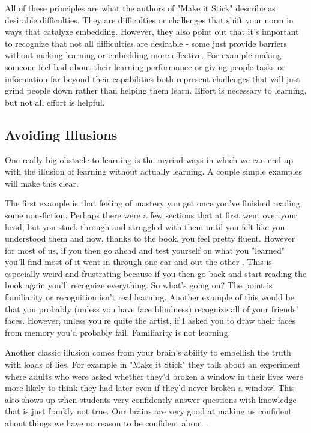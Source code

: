 \documentclass[11pt,a5paper]{book}
\begin{document}
All of these principles are what the authors of "Make it Stick" \cite{stick} describe as desirable difficulties. They are difficulties or challenges that shift your norm in ways that catalyze embedding. However, they also point out that it's important to recognize that not all difficulties are desirable - some just provide barriers without making learning or embedding more effective. For example making someone feel bad about their learning performance or giving people tasks or information far beyond their capabilities both represent challenges that will just grind people down rather than helping them learn. Effort is necessary to learning, but not all effort is helpful.

\subsection{Avoiding Illusions}
One really big obstacle to learning is the myriad ways in which we can end up with the illusion of learning without actually learning. A couple simple examples will make this clear.
\newline

The first example is that feeling of mastery you get once you've finished reading some non-fiction. Perhaps there were a few sections that at first went over your head, but you stuck through and struggled with them until you felt like you understood them and now, thanks to the book, you feel pretty fluent. However for most of us, if you then go ahead and test yourself on what you "learned" you'll find most of it went in through one ear and out the other \cite{stick}. This is especially weird and frustrating because if you then go back and start reading the book again you'll recognize everything. So what's going on? The point is familiarity or recognition isn't real learning. Another example of this would be that you probably (unless you have face blindness) recognize all of your friends' faces. However, unless you're quite the artist, if I asked you to draw their faces from memory you'd probably fail. Familiarity is not learning.
\newline

Another classic illusion comes from your brain's ability to embellish the truth with loads of lies. For example in "Make it Stick" they talk about an experiment where adults who were asked whether they'd broken a window in their lives were more likely to think they had later even if they'd never broken a window! This also shows up when students very confidently answer questions with knowledge that is just frankly not true. Our brains are very good at making us confident about things we have no reason to be confident about \cite{stick}. 
\newline
\end{document}
